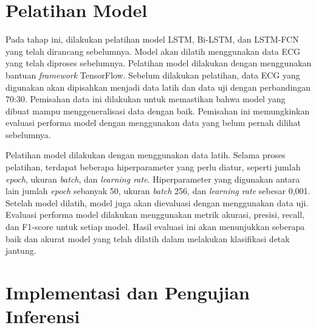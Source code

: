 \section{Pelatihan Model}
\label{subsec: metodologi-pelatihan-model}
Pada tahap ini, dilakukan pelatihan model LSTM, Bi-LSTM, dan LSTM-FCN yang telah dirancang sebelumnya.
Model akan dilatih menggunakan data ECG yang telah diproses sebelumnya.
Pelatihan model dilakukan dengan menggunakan bantuan \textit{framework} TensorFlow.
Sebelum dilakukan pelatihan, data ECG yang digunakan akan dipisahkan menjadi data latih dan data uji dengan perbandingan 70:30.
Pemisahan data ini dilakukan untuk memastikan bahwa model yang dibuat mampu menggeneralisasi data dengan baik.
Pemisahan ini memungkinkan evaluasi performa model dengan menggunakan data yang belum pernah dilihat sebelumnya.

Pelatihan model dilakukan dengan menggunakan data latih.
Selama proses pelatihan, terdapat beberapa hiperparameter yang perlu diatur, seperti jumlah \textit{epoch}, ukuran \textit{batch}, dan \textit{learning rate}.
Hiperparameter yang digunakan antara lain jumlah \textit{epoch} sebanyak 50, ukuran \textit{batch} 256, dan \textit{learning rate} sebesar 0,001.
Setelah model dilatih, model juga akan dievaluasi dengan menggunakan data uji.
Evaluasi performa model dilakukan menggunakan metrik akurasi, presisi, recall, dan F1-score untuk setiap model.
Hasil evaluasi ini akan menunjukkan seberapa baik dan akurat model yang telah dilatih dalam melakukan klasifikasi detak jantung.


\section{Implementasi dan Pengujian Inferensi}
\label{subsec: metodologi-implementasi}

